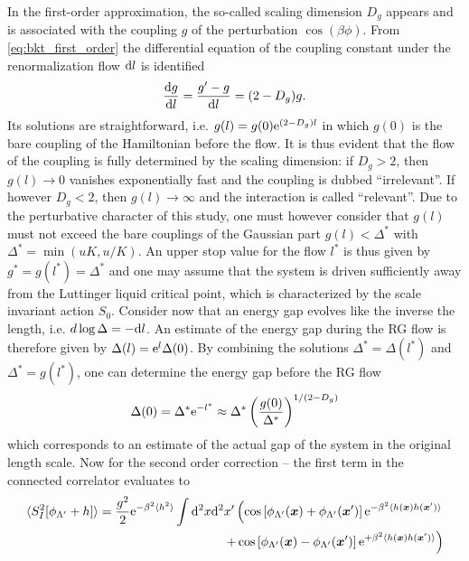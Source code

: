 In the first-order approximation, the so-called scaling dimension $D_g$ appears and is associated with the coupling $g$ of the perturbation $\cos(\beta\phi)$.
From \cref{eq:bkt_first_order} the differential equation of the coupling constant under the renormalization flow $\mathrm d l$ is identified
\begin{align}
    \frac{\mathrm d g}{\mathrm d l} = \frac{g'-g}{\mathrm d l} = (2-D_g)g.
\end{align}
Its solutions are straightforward, i.e. $g(l) = g(0)\mathrm e^{(2-D_g)l}$ in which $g(0)$ is the bare coupling of the Hamiltonian before the flow.
It is thus evident that the flow of the coupling is fully determined by the scaling dimension: if $D_g>2$, then $g(l)\rightarrow0$ vanishes exponentially fast and the coupling is dubbed ``irrelevant''.
If however $D_g<2$, then $g(l)\rightarrow\infty$ and the interaction is called ``relevant''.
Due to the perturbative character of this study, one must however consider that $g(l)$ must not exceed the bare couplings of the Gaussian part $g(l)<\Delta^*$ with $\Delta^*=\min(uK,u/K)$.
An upper stop value for the flow $l^*$ is thus given by $g^*=g(l^*)=\Delta^*$ and one may assume that the system is driven sufficiently away from the Luttinger liquid critical point, which is characterized by the scale invariant action $S_0$.
Consider now that an energy gap evolves like the inverse the length, i.e. $d\log\Delta=-\mathrm d l$.
An estimate of the energy gap during the RG flow is therefore given by $\Delta(l)=\mathrm e^{l}\Delta(0)$.
By combining the solutions $\Delta^*=\Delta(l^*)$ and $\Delta^*=g(l^*)$, one can determine the energy gap before the RG flow
\begin{align}
    \Delta(0) = \Delta^*\mathrm e^{-l^*} \approx \Delta^*\left( \frac{g(0)}{\Delta^*} \right)^{1/(2-D_g)}
\end{align}
which corresponds to an estimate of the actual gap of the system in the original length scale.
Now for the second order correction -- the first term in the connected correlator evaluates to
\begin{align}
    \braket{S^2_I[\phi_{\Lambda'}+h]}=\frac{g^2}2\mathrm e^{-\beta^2\braket{h^2}}\int\mathrm d^2x\mathrm d^2x'
    \left(
        \cos\left[ \phi_{\Lambda'}({\bm x})+\phi_{\Lambda'}({\bm x'}) \right]\mathrm e^{-\beta^2\braket{h({\bm x})h({\bm x'})}}
        \right.\\
        \left.+
        \cos\left[ \phi_{\Lambda'}({\bm x})-\phi_{\Lambda'}({\bm x'}) \right]\mathrm e^{+\beta^2\braket{h({\bm x})h({\bm x'})}}
    \right)
    \label{eq:second_order_rg_term1}
\end{align}
